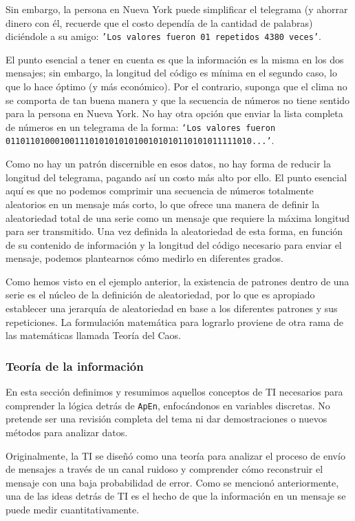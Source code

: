 \documentclass[a4paper,12pt]{article}
\begin{document}
Sin embargo, la persona en Nueva York puede simplificar el telegrama (y ahorrar dinero con él, recuerde que el costo dependía de la cantidad de palabras) diciéndole a su amigo: \texttt{'Los valores fueron 01 repetidos 4380 veces'}. 

El punto esencial a tener en cuenta es que la información es la misma en los dos mensajes; sin embargo, la longitud del código es mínima en el segundo caso, lo que lo hace óptimo (y más económico). Por el contrario, suponga que el clima no se comporta de tan buena manera y que la secuencia de números no tiene sentido para la persona en Nueva York. No hay otra opción que enviar la lista completa de números en un telegrama de la forma: \texttt{`Los valores fueron 01101101000100111010101010100101010110101011111010...'}. 

Como no hay un patrón discernible en esos datos, no hay forma de reducir la longitud del telegrama, pagando así un costo más alto por ello. El punto esencial aquí es que no podemos comprimir una secuencia de números totalmente aleatorios en un mensaje más corto, lo que ofrece una manera de definir la aleatoriedad total de una serie como un mensaje que requiere la máxima longitud para ser transmitido. Una vez definida la aleatoriedad de esta forma, en función de su contenido de información y la longitud del código necesario para enviar el mensaje, podemos plantearnos cómo medirlo en diferentes grados. 

Como hemos visto en el ejemplo anterior, la existencia de patrones dentro de una serie es el núcleo de la definición de aleatoriedad, por lo que es apropiado establecer una jerarquía de aleatoriedad en base a los diferentes patrones y sus repeticiones. La formulación matemática para lograrlo proviene de otra rama de las matemáticas llamada Teoría del Caos. 

\subsubsection{Teoría de la información}

En esta sección definimos y resumimos aquellos conceptos de TI necesarios para comprender la lógica detrás de \texttt{ApEn}, enfocándonos en variables discretas. No pretende ser una revisión completa del tema ni dar demostraciones o nuevos métodos para analizar datos.

Originalmente, la TI se diseñó como una teoría para analizar el proceso de envío de mensajes a través de un canal ruidoso y comprender cómo reconstruir el mensaje con una baja probabilidad de error. Como se mencionó anteriormente, una de las ideas detrás de TI es el hecho de que la información en un mensaje se puede medir cuantitativamente. 
\end{document}
